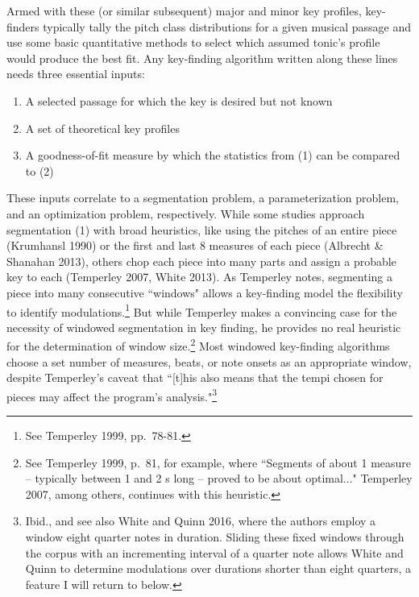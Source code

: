 Armed with these (or similar subsequent) major and minor key profiles, key-finders typically tally the pitch class distributions for a given musical passage and use some basic quantitative methods to select which assumed tonic's profile would produce the best fit.  Any key-finding algorithm written along these lines needs three essential inputs:
\begin{enumerate}
	\item A selected passage for which the key is desired but not known
	\item A set of theoretical key profiles
	\item A goodness-of-fit measure by which the statistics from (1) can be compared to (2)
\end{enumerate}
These inputs correlate to a segmentation problem, a parameterization problem, and an optimization problem, respectively.  While some studies approach segmentation (1) with broad heuristics, like using the pitches of an entire piece (Krumhansl 1990) or the first and last 8 measures of each piece (Albrecht \& Shanahan 2013), others chop each piece into many parts and assign a probable key to each (Temperley 2007, White 2013).  As Temperley notes, segmenting a piece into many consecutive ``windows" allows a key-finding model the flexibility to identify modulations.\footnote{See Temperley 1999, pp.\ 78-81.}  But while Temperley makes a convincing case for the necessity of windowed segmentation in key finding, he provides no real heuristic for the determination of window size.\footnote{See Temperley 1999, p.\ 81, for example, where ``Segments of about 1 measure -- typically between 1 and 2 s long -- proved to be about optimal..."  Temperley 2007, among others, continues with this heuristic.}  Most windowed key-finding algorithms choose a set number of measures, beats, or note onsets as an appropriate window, despite Temperley's caveat that ``[t]his also means that the tempi chosen for pieces may affect the program's analysis."\footnote{Ibid., and see also White and Quinn 2016, where the authors employ a window eight quarter notes in duration.  Sliding these fixed windows through the corpus with an incrementing interval of a quarter note allows White and Quinn to determine modulations over durations shorter than eight quarters, a feature I will return to below.}

